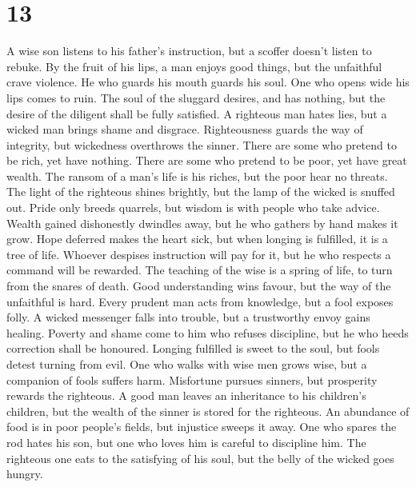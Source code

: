 \hypertarget{section-12}{%
\section{13}\label{section-12}}

 A wise son listens to his father's instruction, but a
scoffer doesn't listen to rebuke.  By the fruit of his
lips, a man enjoys good things, but the unfaithful crave violence.
 He who guards his mouth guards his soul. One who opens
wide his lips comes to ruin.  The soul of the sluggard
desires, and has nothing, but the desire of the diligent shall be fully
satisfied.  A righteous man hates lies, but a wicked man
brings shame and disgrace.  Righteousness guards the way
of integrity, but wickedness overthrows the sinner.  There
are some who pretend to be rich, yet have nothing. There are some who
pretend to be poor, yet have great wealth.  The ransom of
a man's life is his riches, but the poor hear no threats. 
The light of the righteous shines brightly, but the lamp of the wicked
is snuffed out.  Pride only breeds quarrels, but wisdom
is with people who take advice.  Wealth gained
dishonestly dwindles away, but he who gathers by hand makes it grow.
 Hope deferred makes the heart sick, but when longing is
fulfilled, it is a tree of life.  Whoever despises
instruction will pay for it, but he who respects a command will be
rewarded.  The teaching of the wise is a spring of life,
to turn from the snares of death.  Good understanding
wins favour, but the way of the unfaithful is hard. 
Every prudent man acts from knowledge, but a fool exposes folly.
 A wicked messenger falls into trouble, but a trustworthy
envoy gains healing.  Poverty and shame come to him who
refuses discipline, but he who heeds correction shall be honoured.
 Longing fulfilled is sweet to the soul, but fools detest
turning from evil.  One who walks with wise men grows
wise, but a companion of fools suffers harm.  Misfortune
pursues sinners, but prosperity rewards the righteous.  A
good man leaves an inheritance to his children's children, but the
wealth of the sinner is stored for the righteous.  An
abundance of food is in poor people's fields, but injustice sweeps it
away.  One who spares the rod hates his son, but one who
loves him is careful to discipline him.  The righteous
one eats to the satisfying of his soul, but the belly of the wicked goes
hungry.

